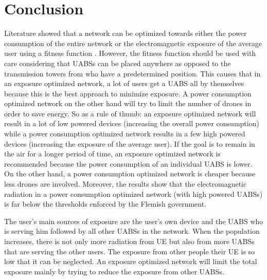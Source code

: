 \documentclass[twocolumn]{phdsymp} %
\begin{document}
\section{Conclusion}
Literature showed that a network can be optimized towards either the power consumption of the entire network 
or the electromagnetic exposure of the average user using a fitness function \cite{J1}.
However, the fitness function should be used with care considering that \gls{UABS}s can be placed anywhere as opposed to 
the transmission towers from \cite{J1} who have a predetermined position. This causes that in an exposure optimized network, 
a lot of users get a \gls{UABS}
all by themselves because this is the best approach to minimize exposure.
A power consumption optimized network on the other hand will try to limit the number of drones 
in order to save energy. 
So as a rule of thumb: an exposure optimized network will result in a lot of low powered devices (increasing the overall power consumption)
while a power consumption optimized network results in a few high powered devices (increasing the exposure of the average user).
If the goal is to remain in the air for a longer period of time, an exposure optimized network is recommended because the power consumption of 
an individual \gls{UABS} is lower.
On the other hand, a power consumption optimized network is cheaper because less drones are involved. 
Moreover, the results show that the electromagnetic radiation in a power consumption optimized network (with high powered \gls{UABS}s)
is far below the thresholds enforced by the Flemish government.

The user's main sources of exposure are the user's own device and the \gls{UABS} who is serving him followed by all
other \gls{UABS}s in the network. 
When the population increases, there is not only more radiation from \gls{UE} but also 
from more \gls{UABS}s that are serving the other users.
The exposure from other people their \gls{UE} is so low that it can be neglected.
An exposure optimized network will limit the total exposure mainly by trying to reduce the exposure from other \gls{UABS}s.
\end{document}
